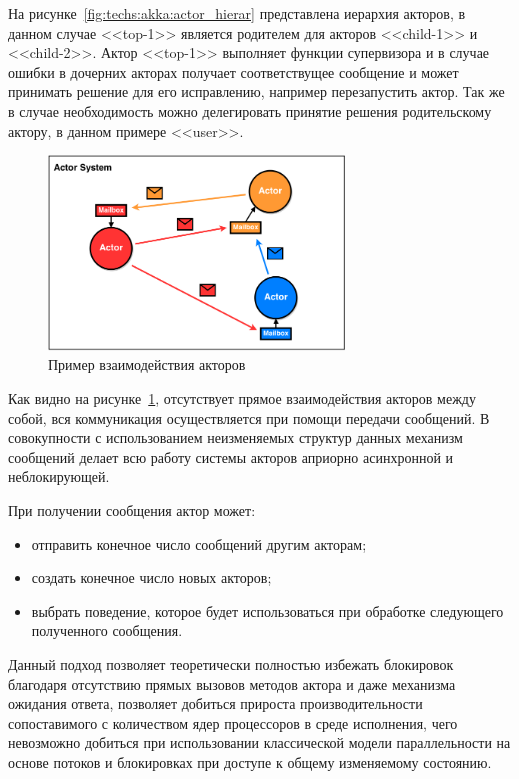 На рисунке~\ref{fig:techs:akka:actor_hierar} представлена иерархия акторов, в данном случае <<top-1>> является родителем для акторов <<child-1>> и <<child-2>>. Актор <<top-1>> выполняет функции супервизора и в случае ошибки в дочерних акторах получает соответствущее сообщение и может принимать решение для его исправлению, например перезапустить актор. Так же в случае необходимость можно делегировать принятие решения родительскому актору, в данном примере <<user>>. 
\begin{figure}[ht]
    \centering
    \includegraphics[width=0.7\textwidth]{figures/actor_model.png}
    \caption{Пример взаимодействия акторов}
    \label{fig:techs:akka:actor_model:comulication}
\end{figure}

Как видно на рисунке~\ref{fig:techs:akka:actor_model:comulication}, отсутствует прямое взаимодействия акторов между собой, вся коммуникация осуществляется при помощи передачи сообщений. В совокупности с использованием неизменяемых структур данных механизм сообщений делает всю работу системы акторов априорно асинхронной и неблокирующей.

При получении сообщения актор может:
\begin{itemize}
  \item отправить конечное число сообщений другим акторам;
  \item создать конечное число новых акторов;
  \item выбрать поведение, которое будет использоваться при обработке следующего полученного сообщения.
\end{itemize}

Данный подход позволяет теоретически полностью избежать блокировок благодаря отсутствию прямых вызовов методов актора и даже механизма ожидания ответа, позволяет добиться прироста производительности сопоставимого с количеством ядер процессоров в среде исполнения, чего невозможно добиться при использовании классической модели параллельности на основе потоков и блокировках при доступе к общему изменяемому состоянию.

